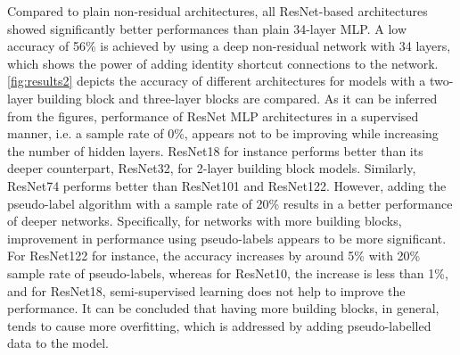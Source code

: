  Compared to plain non-residual architectures, all ResNet-based architectures showed significantly better performances than plain 34-layer MLP. A low accuracy of 56\% is achieved by using a deep non-residual network with 34 layers, which shows the power of adding identity shortcut connections to the network. \cref{fig:results2} depicts the accuracy of different architectures for models with a two-layer building block and three-layer blocks are compared.  As it can be inferred from the figures, performance of ResNet MLP architectures in a supervised manner, i.e. a sample rate of 0\%, appears not to be improving while increasing the number of hidden layers. ResNet18 for instance performs better than its deeper counterpart, ResNet32, for 2-layer building block models. Similarly, ResNet74 performs better than ResNet101 and ResNet122. However, adding the pseudo-label algorithm with a sample rate of 20\% results in a better performance of deeper networks. Specifically, for networks with more building blocks, improvement in performance using pseudo-labels appears to be more significant. For ResNet122 for instance, the accuracy increases by around 5\% with 20\% sample rate of pseudo-labels, whereas for ResNet10, the increase is less than 1\%, and for ResNet18, semi-supervised learning does not help to improve the performance. It can be concluded that having more building blocks, in general, tends to cause more overfitting, which is addressed by adding pseudo-labelled data to the model. 
 
